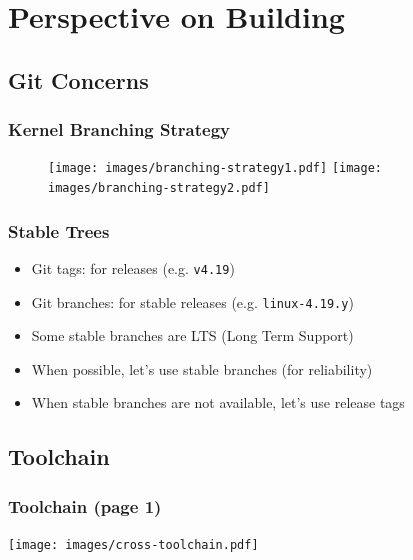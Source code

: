 \documentclass[aspectratio=169]{beamer}
\begin{document}
\section{Perspective on Building}

\subsection{Git Concerns}

\begin{frame}
  \frametitle{Kernel Branching Strategy}
  \begin{overlayarea}{\textwidth}{\textheight}
    \begin{figure}
      \centering
      {%
      \texttt{[image: images/branching-strategy1.pdf]}%
      }%
      {%
      \texttt{[image: images/branching-strategy2.pdf]}%
      }%
    \end{figure}
  \end{overlayarea}
  \vspace*{-10mm}
\end{frame}

\begin{frame}
  \frametitle{Stable Trees}
  \begin{itemize}
    \item Git tags: for releases (e.g. \texttt{v4.19})
    \item Git branches: for stable releases (e.g. \texttt{linux-4.19.y})
    \item Some stable branches are LTS (Long Term Support)
    \item When possible, let's use stable branches (for reliability)
    \item When stable branches are not available, let's use release tags
  \end{itemize}
\end{frame}

\subsection{Toolchain}

\begin{frame}
  \frametitle{Toolchain (page 1)}
  \begin{center}
    \texttt{[image: images/cross-toolchain.pdf]}
  \end{center}
\end{frame}
\end{document}
